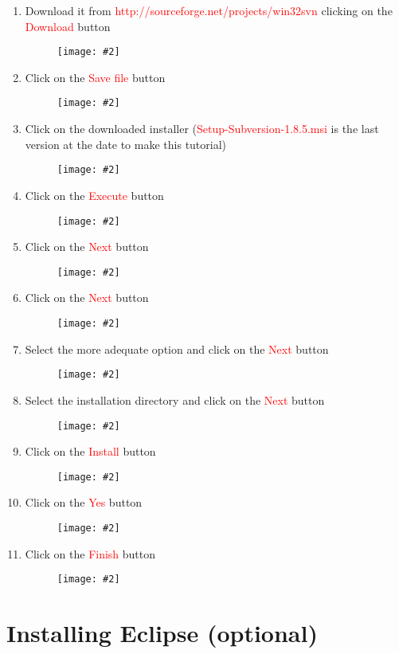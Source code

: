 \documentclass[a4paper]{article}
\newcommand{\FIG}[2]
{
	\begin{figure}[ht!]
	\centering
	\texttt{[image: \#2]}
	\end{figure}
}
\newcommand{\FIGUREB}[1]{\FIG{0.26}{#1}}
\newcommand{\RED}[1] {\textcolor{red}{#1}}
\begin{document}
\begin{enumerate}

\item Download it from \RED{http://sourceforge.net/projects/win32svn} clicking
on the \RED{Download} button
\FIGUREB{subversion-1.png.eps}

\clearpage

\item Click on the \RED{Save file} button
\FIGUREB{subversion-2.png.eps}

\item Click on the downloaded installer (\RED{Setup-Subversion-1.8.5.msi} is the
last version at the date to make this tutorial)
\FIGUREB{subversion-3.png.eps}

\clearpage

\item Click on the \RED{Execute} button
\FIGUREB{subversion-4.png.eps}

\item Click on the \RED{Next} button
\FIGUREB{subversion-5.png.eps}

\clearpage

\item Click on the \RED{Next} button
\FIGUREB{subversion-6.png.eps}

\item Select the more adequate option and click on the \RED{Next} button
\FIGUREB{subversion-7.png.eps}

\clearpage

\item Select the installation directory and click on the \RED{Next} button
\FIGUREB{subversion-8.png.eps}

\item Click on the \RED{Install} button
\FIGUREB{subversion-9.png.eps}

\clearpage

\item Click on the \RED{Yes} button
\FIGUREB{subversion-10.png.eps}

\item Click on the \RED{Finish} button
\FIGUREB{subversion-11.png.eps}

\end{enumerate}

\clearpage

\section{Installing Eclipse (optional)}
\end{document}
